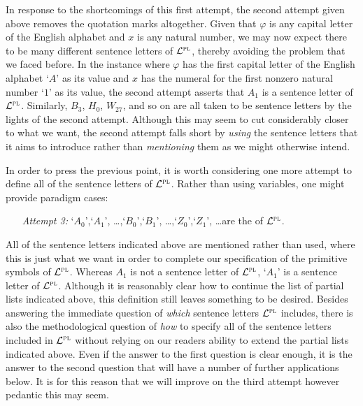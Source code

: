In response to the shortcomings of this first attempt, the second attempt given above removes the quotation marks altogether.
Given that $\varphi$ is any capital letter of the English alphabet and $x$ is any natural number, we may now expect there to be many different sentence letters of $\mathcal{L}^{\textsc{pl}}$, thereby avoiding the problem that we faced before.
In the instance where $\varphi$ has the first capital letter of the English alphabet `$A$' as its value and $x$ has the numeral for the first nonzero natural number `$1$' as its value, the second attempt asserts that $A_1$ is a sentence letter of $\mathcal{L}^{\textsc{pl}}$. 
Similarly, $B_3$, $H_0$, $W_{27}$, and so on are all taken to be sentence letters by the lights of the second attempt.
Although this may seem to cut considerably closer to what we want, the second attempt falls short by \textit{using} the sentence letters that it aims to introduce rather than \textit{mentioning} them as we might otherwise intend.

In order to press the previous point, it is worth considering one more attempt to define all of the sentence letters of $\mathcal{L}^{\textsc{pl}}$.
Rather than using variables, one might provide paradigm cases:

\begin{enumerate}[leftmargin=1.25in, itemsep=-.4em]
  \item[\it Attempt 3:] `$A_0$',`$A_1$', \ldots,`$B_0$',`$B_1$', \ldots,`$Z_0$',`$Z_1$', \ldots are the  of $\mathcal{L}^{\textsc{pl}}$.
\end{enumerate}

All of the sentence letters indicated above are mentioned rather than used, where this is just what we want in order to complete our specification of the primitive symbols of $\mathcal{L}^{\textsc{pl}}$.
Whereas $A_1$ is not a sentence letter of $\mathcal{L}^{\textsc{pl}}$, `$A_1$' is a sentence letter of $\mathcal{L}^{\textsc{pl}}$. 
Although it is reasonably clear how to continue the list of partial lists indicated above, this definition still leaves something to be desired.
Besides answering the immediate question of \textit{which} sentence letters $\mathcal{L}^{\textsc{pl}}$ includes, there is also the methodological question of \textit{how} to specify all of the sentence letters included in $\mathcal{L}^{\textsc{pl}}$ without relying on our readers ability to extend the partial lists indicated above. 
Even if the answer to the first question is clear enough, it is the answer to the second question that will have a number of further applications below.
It is for this reason that we will improve on the third attempt however pedantic this may seem. %




